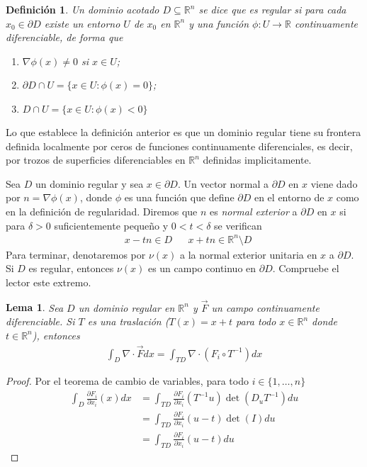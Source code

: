 \documentclass{report}
\newcommand{\realNumbers}{\mathbb{R}}
\newtheorem{definition}{Definición}
\newtheorem{lemma}{Lema}
\theoremstyle{remark}
\begin{document}
  \begin{definition}
    Un dominio acotado \(D \subseteq \realNumbers^n\) se dice que es regular si para cada \(x_0 \in \partial D\) existe un entorno \(U\) de \(x_0\) en \(\realNumbers^n\) y una función \(\phi : U \rightarrow \realNumbers\) continuamente diferenciable, de forma que
    \begin{enumerate}
      \item \(\nabla \phi(x) \neq 0\) si \(x \in U\);
      \item \(\partial D \cap U = \{x \in U : \phi(x) = 0\}\);
      \item \(D \cap U = \{x \in U : \phi(x) < 0\}\)
    \end{enumerate}
  \end{definition}

  Lo que establece la definición anterior es que un dominio regular tiene su frontera definida localmente por ceros de funciones continuamente diferenciales, es decir, por trozos de superficies diferenciables en \(\realNumbers^n\) definidas implicitamente.

  Sea \(D\) un dominio regular y sea \(x \in \partial D\).
  Un vector normal a \(\partial D\) en \(x\) viene dado por \(n = \nabla \phi(x)\), donde \(\phi\) es una función que define \(\partial D\) en el entorno de \(x\) como en la definición de regularidad.
  Diremos que \(n\) es \emph{normal exterior} a \(\partial D\) en \(x\) si para \(\delta > 0\) suficientemente pequeño y \(0 < t < \delta\) se verifican
  \begin{align}
    &x - t n \in D
    &&x + t n \in \realNumbers^n \setminus D
  \end{align}
  Para terminar, denotaremos por \(\nu(x)\) a la normal exterior unitaria en \(x\) a \(\partial D\).
  Si \(D\) es regular, entonces \(\nu(x)\) es un campo continuo en \(\partial D\).
  Compruebe el lector este extremo.


  \begin{lemma}
    Sea \(D\) un dominio regular en \(\realNumbers^n\) y \(\vec{F}\)  un campo continuamente diferenciable.
    Si \(T\) es una traslación (\(T(x) = x + t\) para todo \(x \in \realNumbers^n\) donde \(t \in \realNumbers^n\)), entonces
    \begin{align}
      \int_D
        \nabla \cdot \vec{F}
      dx
      =
      \int_{T D}
        \nabla \cdot (F_i \circ T^{- 1})
      dx
    \end{align}
  \end{lemma}
  \begin{proof}
    Por el teorema de cambio de variables, para todo \(i \in \{1, \dots, n\}\)
    \begin{align}
      \int_D \frac{\partial F_i}{\partial x_i}(x) dx
      &=
      \int_{T D}
        \frac{\partial F_i}{\partial x_i}(T^{- 1} u)
        \det\left(D_u T^{-1}\right)
      du
      \\
      &=
      \int_{T D}
        \frac{\partial F_i}{\partial x_i}(u - t)
        \det(I)
      du
      \\
      &=
      \int_{T D}
        \frac{\partial F_i}{\partial x_i}(u - t)
      du
    \end{align}
  \end{proof}
\end{document}
